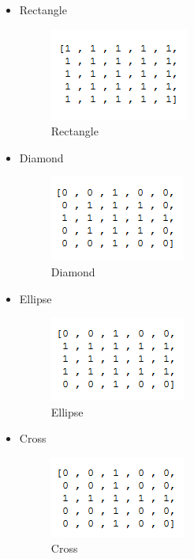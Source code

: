 \documentclass[]{article}
\begin{document}
\begin{itemize}
\item
  Rectangle

  \begin{figure}[htbp]
  \centering
  \includegraphics{images/Morphological Operations/Images/Rectangle.PNG}
  \caption{Rectangle}
  \end{figure}
\pagebreak
\item
  Diamond

  \begin{figure}[htbp]
  \centering
  \includegraphics{images/Morphological Operations/Images/Diamond.PNG}
  \caption{Diamond}
  \end{figure}
\item
  Ellipse

  \begin{figure}[htbp]
  	\centering
  	\includegraphics{images/Morphological Operations/Images/Ellipse.PNG}
  	\caption{Ellipse}
  \end{figure}
\item
  Cross

  \begin{figure}[htbp]
  \centering
  \includegraphics{images/Morphological Operations/Images/Cross.PNG}
  \caption{Cross}
  \end{figure}
\end{itemize}
\end{document}
